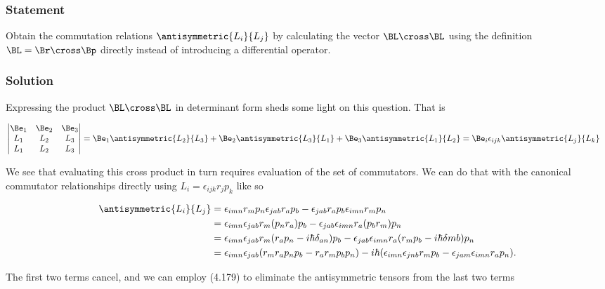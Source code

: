 \subsubsection{Statement}

Obtain the commutation relations $\antisymmetric{L_i}{L_j}$ by calculating the vector $\BL \cross \BL$ using the definition $\BL = \Br \cross \Bp$ directly instead of introducing a differential operator.

\subsubsection{Solution}

Expressing the product $\BL \cross \BL$ in determinant form sheds some light on this question.  That is

\begin{align}\label{eqn:desaiCh4:300}
\begin{vmatrix}
 \Be_1 & \Be_2 & \Be_3 \\
 L_1 & L_2 & L_3 \\
 L_1 & L_2 & L_3
\end{vmatrix}
&=
 \Be_1 \antisymmetric{L_2}{L_3}
 +\Be_2 \antisymmetric{L_3}{L_1}
 +\Be_3 \antisymmetric{L_1}{L_2}
= \Be_i \epsilon_{ijk} \antisymmetric{L_j}{L_k}
\end{align}

We see that evaluating this cross product in turn requires evaluation of the set of commutators.  We can do that with the canonical commutator relationships directly using $L_i = \epsilon_{ijk} r_j p_k$ like so

\begin{align*}
\antisymmetric{L_i}{L_j}
&=
\epsilon_{imn} r_m p_n \epsilon_{jab} r_a p_b
- \epsilon_{jab} r_a p_b \epsilon_{imn} r_m p_n \\
&=
\epsilon_{imn} \epsilon_{jab} r_m (p_n r_a) p_b
- \epsilon_{jab} \epsilon_{imn} r_a (p_b r_m) p_n \\
&=
\epsilon_{imn} \epsilon_{jab} r_m (r_a p_n -i \hbar \delta_{an}) p_b
- \epsilon_{jab} \epsilon_{imn} r_a (r_m p_b - i \hbar \delta{mb}) p_n \\
&=
\epsilon_{imn} \epsilon_{jab} (r_m r_a p_n p_b - r_a r_m p_b p_n )
- i \hbar ( \epsilon_{imn} \epsilon_{jnb} r_m p_b - \epsilon_{jam} \epsilon_{imn} r_a p_n ).
\end{align*}

The first two terms cancel, and we can employ (4.179) to eliminate the antisymmetric tensors from the last two terms

